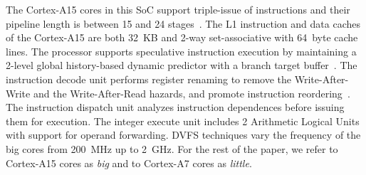 The Cortex-A15 cores in this SoC support triple-issue of instructions and their pipeline length is 
between 15 and 24 stages~\cite{MPR_A15}. The L1 instruction and data caches of the Cortex-A15 are 
both 32~KB and 2-way set-associative with 64~byte cache lines. The processor supports speculative 
instruction execution by maintaining a 2-level global history-based dynamic predictor 
with a branch target buffer~\cite{TRM_A15}. The instruction decode unit performs register renaming 
to remove the Write-After-Write and the Write-After-Read hazards, and promote 
instruction reordering~\cite{TRM_A15}. The instruction dispatch unit analyzes instruction dependences 
before issuing them for execution.  The integer execute unit includes 2 
Arithmetic Logical Units with support for operand forwarding. DVFS techniques vary the 
frequency of the big cores from 200~MHz up to 2~GHz.
For the rest of the paper, we refer to Cortex-A15 cores as \textit{big} and to Cortex-A7 cores as \textit{little}.







